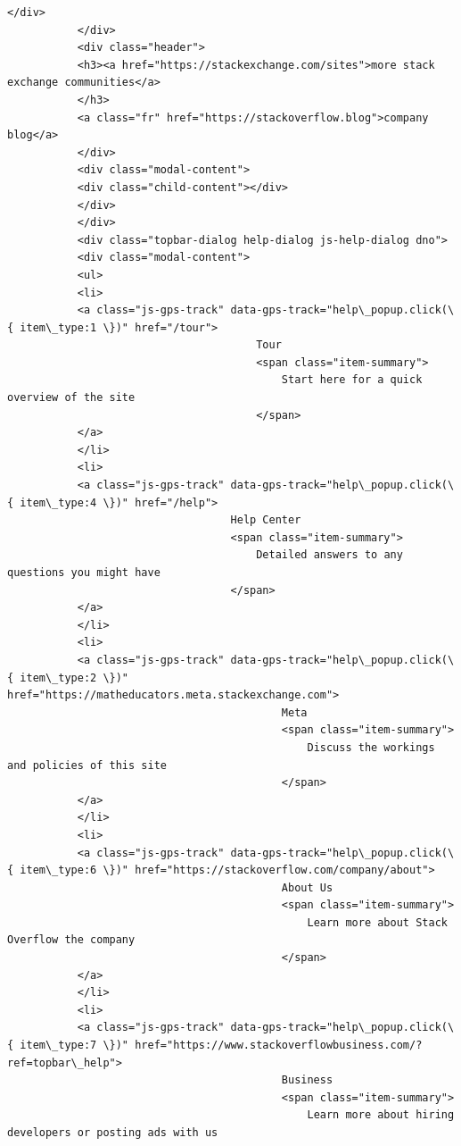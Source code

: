 \documentclass[11pt]{article}
\begin{document}
\begin{Verbatim}[commandchars=\\\{\}]
                           </div>
           </div>
           <div class="header">
           <h3><a href="https://stackexchange.com/sites">more stack exchange communities</a>
           </h3>
           <a class="fr" href="https://stackoverflow.blog">company blog</a>
           </div>
           <div class="modal-content">
           <div class="child-content"></div>
           </div>
           </div>
           <div class="topbar-dialog help-dialog js-help-dialog dno">
           <div class="modal-content">
           <ul>
           <li>
           <a class="js-gps-track" data-gps-track="help\_popup.click(\{ item\_type:1 \})" href="/tour">
                                       Tour
                                       <span class="item-summary">
                                           Start here for a quick overview of the site
                                       </span>
           </a>
           </li>
           <li>
           <a class="js-gps-track" data-gps-track="help\_popup.click(\{ item\_type:4 \})" href="/help">
                                   Help Center
                                   <span class="item-summary">
                                       Detailed answers to any questions you might have
                                   </span>
           </a>
           </li>
           <li>
           <a class="js-gps-track" data-gps-track="help\_popup.click(\{ item\_type:2 \})" href="https://matheducators.meta.stackexchange.com">
                                           Meta
                                           <span class="item-summary">
                                               Discuss the workings and policies of this site
                                           </span>
           </a>
           </li>
           <li>
           <a class="js-gps-track" data-gps-track="help\_popup.click(\{ item\_type:6 \})" href="https://stackoverflow.com/company/about">
                                           About Us
                                           <span class="item-summary">
                                               Learn more about Stack Overflow the company
                                           </span>
           </a>
           </li>
           <li>
           <a class="js-gps-track" data-gps-track="help\_popup.click(\{ item\_type:7 \})" href="https://www.stackoverflowbusiness.com/?ref=topbar\_help">
                                           Business
                                           <span class="item-summary">
                                               Learn more about hiring developers or posting ads with us

\end{Verbatim}
\end{document}
